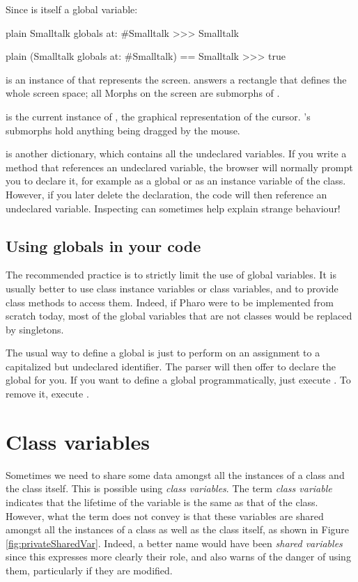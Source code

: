 \documentclass[10pt,twoside,english]{_support/latex/sbabook/sbabook}
\begin{document}
Since  is itself a global variable:

\begin{displaycode}{plain}
Smalltalk globals at: #Smalltalk
>>> Smalltalk
\end{displaycode}

\begin{displaycode}{plain}
(Smalltalk globals at: #Smalltalk) == Smalltalk
>>> true
\end{displaycode}

\textbf{} is an instance of  that represents the screen.
 answers a rectangle that defines the whole screen space; all
Morphs on the screen are submorphs of .

\textbf{} is the current instance of , the graphical
representation of the cursor. 's submorphs hold anything being
dragged by the mouse.

\textbf{} is another dictionary, which contains all the undeclared
variables. If you write a method that references an undeclared variable, the
browser will normally prompt you to declare it, for example as a global or as an
instance variable of the class. However, if you later delete the declaration,
the code will then reference an undeclared variable. Inspecting 
can sometimes help explain strange behaviour!
\subsection{Using globals in your code}
The recommended practice is to strictly limit the use of global variables. It is
usually better to use class instance variables or class variables, and to
provide class methods to access them. Indeed, if Pharo were to be implemented
from scratch today, most of the global variables that are not classes would be
replaced by singletons.

The usual way to define a global is just to perform  on an assignment
to a capitalized but undeclared identifier. The parser will then offer to
declare the global for you. If you want to define a global programmatically,
just execute . To remove it,
execute .
\section{Class variables}\label{sec:classVars}
Sometimes we need to share some data amongst all the instances of a class and
the class itself. This is possible using \textit{class variables}. The term \textit{class
variable} indicates that the lifetime of the variable is the same as that of
the class. However, what the term does not convey is that these variables are
shared amongst all the instances of a class as well as the class itself, as
shown in Figure \ref{fig:privateSharedVar}. Indeed, a better name would have been
\textit{shared variables} since this expresses more clearly their role, and also
warns of the danger of using them, particularly if they are modified.
\end{document}
